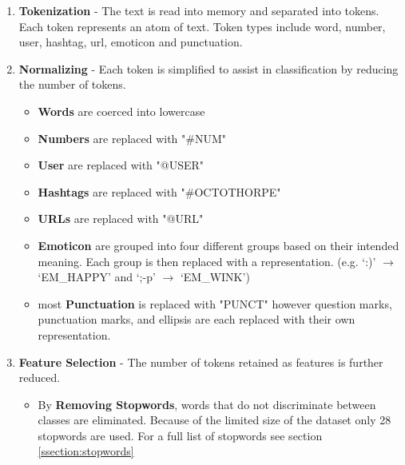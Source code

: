 \documentclass[final,3p,12pt]{elsarticle}
\begin{document}
\begin{enumerate}

    \item \textbf{Tokenization} - The text is read into memory and separated into
        tokens. Each token represents an atom of text. Token types include
        word, number, user, hashtag, url, emoticon and punctuation.

    \item \textbf{Normalizing} - Each token is simplified to assist in
        classification by reducing the number of tokens.

        \begin{itemize}

            \item \textbf{Words} are coerced into lowercase

            \item \textbf{Numbers} are replaced with "\#NUM"

            \item \textbf{User} are replaced with "@USER"

            \item \textbf{Hashtags} are replaced with "\#OCTOTHORPE"

            \item \textbf{URLs} are replaced with "@URL"

            \item \textbf{Emoticon} are grouped into four different groups
                based on their intended meaning. Each group is then replaced
                with a representation. (e.g. `:)' $\rightarrow$ `EM\_HAPPY' and
                `;-p' $\rightarrow$ `EM\_WINK')

            \item most \textbf{Punctuation} is replaced with "PUNCT" however
                question marks, punctuation marks, and ellipsis are each
                replaced with their own representation.

        \end{itemize}

    \item \textbf{Feature Selection} - The number of tokens retained as
        features is further reduced.
        \begin{itemize}

            \item By \textbf{Removing Stopwords}, words that do not
                discriminate between classes are eliminated. Because of the
                limited size of the dataset only 28 stopwords are used. For a
                full list of stopwords see section \ref{ssection:stopwords}


\end{itemize}
\end{enumerate}
\end{document}
